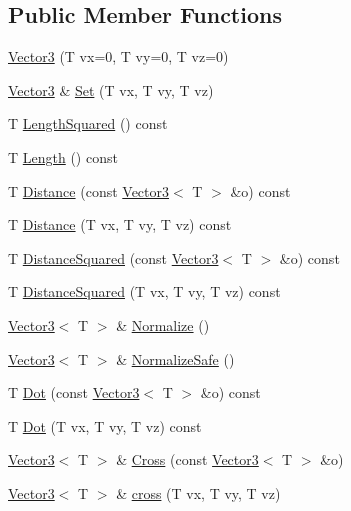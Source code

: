 \subsection*{Public Member Functions}
\begin{DoxyCompactItemize}
\item 
\hyperlink{classastu_1_1Vector3_aa890c907a96b7a820d111650d367c128}{Vector3} (T vx=0, T vy=0, T vz=0)
\item 
\hyperlink{classastu_1_1Vector3}{Vector3} \& \hyperlink{classastu_1_1Vector3_ad2fbb709dfc8b58f8eaf3706e3d469da}{Set} (T vx, T vy, T vz)
\item 
T \hyperlink{classastu_1_1Vector3_a49a169511b4b38518aee7f03af0abbe6}{Length\+Squared} () const
\item 
T \hyperlink{classastu_1_1Vector3_a77809953007a22f248c4a1bc53a6c703}{Length} () const
\item 
T \hyperlink{classastu_1_1Vector3_a5da41a1b4dfff71615648085b428e6a2}{Distance} (const \hyperlink{classastu_1_1Vector3}{Vector3}$<$ T $>$ \&o) const
\item 
T \hyperlink{classastu_1_1Vector3_a244eeb4894f204aace5a5e2ffb56f10a}{Distance} (T vx, T vy, T vz) const
\item 
T \hyperlink{classastu_1_1Vector3_a911f6effa128156f5925a5298469df18}{Distance\+Squared} (const \hyperlink{classastu_1_1Vector3}{Vector3}$<$ T $>$ \&o) const
\item 
T \hyperlink{classastu_1_1Vector3_acd7c764b598e05bf18b267f3d42253e4}{Distance\+Squared} (T vx, T vy, T vz) const
\item 
\hyperlink{classastu_1_1Vector3}{Vector3}$<$ T $>$ \& \hyperlink{classastu_1_1Vector3_a6cac4790b57eb2db4b1d87d8304547f1}{Normalize} ()
\item 
\hyperlink{classastu_1_1Vector3}{Vector3}$<$ T $>$ \& \hyperlink{classastu_1_1Vector3_a896ab2b924daa9f9348f86b3eb50e428}{Normalize\+Safe} ()
\item 
T \hyperlink{classastu_1_1Vector3_aabbcc7c656b8ea7d1869a29118252029}{Dot} (const \hyperlink{classastu_1_1Vector3}{Vector3}$<$ T $>$ \&o) const
\item 
T \hyperlink{classastu_1_1Vector3_a439b2929d552fc30dc3ad802a1645f07}{Dot} (T vx, T vy, T vz) const
\item 
\hyperlink{classastu_1_1Vector3}{Vector3}$<$ T $>$ \& \hyperlink{classastu_1_1Vector3_a55a444d15a70dde712fe354c21136bc3}{Cross} (const \hyperlink{classastu_1_1Vector3}{Vector3}$<$ T $>$ \&o)
\item 
\hyperlink{classastu_1_1Vector3}{Vector3}$<$ T $>$ \& \hyperlink{classastu_1_1Vector3_acbcaea35e7dd5b6074379d265d820147}{cross} (T vx, T vy, T vz)

\end{DoxyCompactItemize}
